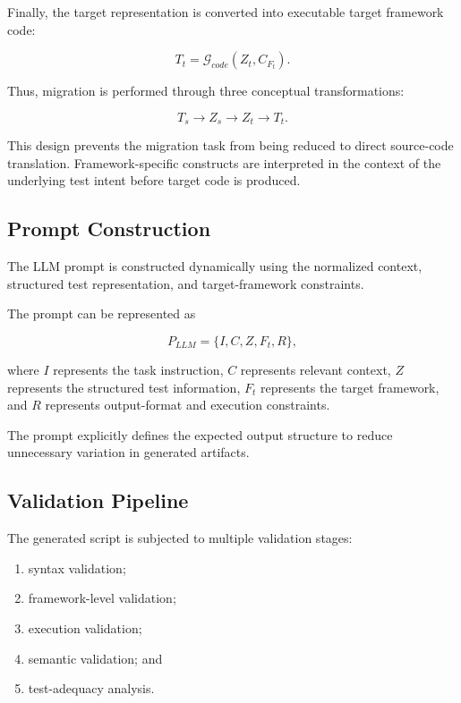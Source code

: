 \documentclass[pdflatex,sn-mathphys-num]{sn-jnl}
\begin{document}
Finally, the target representation is converted into executable target
framework code:

\begin{equation}
    T_t
    =
    \mathcal{G}_{code}
    (
        Z_t,
        C_{F_t}
    ).
\label{eq:migrated-script}
\end{equation}

Thus, migration is performed through three conceptual transformations:

\begin{equation}
    T_s
    \rightarrow
    Z_s
    \rightarrow
    Z_t
    \rightarrow
    T_t.
\label{eq:complete-migration}
\end{equation}

This design prevents the migration task from being reduced to direct
source-code translation. Framework-specific constructs are interpreted in
the context of the underlying test intent before target code is produced.

\subsection{Prompt Construction}
\label{subsec:prompt-construction}

The LLM prompt is constructed dynamically using the normalized context,
structured test representation, and target-framework constraints.

The prompt can be represented as

\begin{equation}
    P_{LLM}
    =
    \{
    I,
    C,
    Z,
    F_t,
    R
    \},
\label{eq:prompt}
\end{equation}

where $I$ represents the task instruction, $C$ represents relevant context,
$Z$ represents the structured test information, $F_t$ represents the target
framework, and $R$ represents output-format and execution constraints.

The prompt explicitly defines the expected output structure to reduce
unnecessary variation in generated artifacts.

\subsection{Validation Pipeline}
\label{subsec:validation-pipeline}

The generated script is subjected to multiple validation stages:

\begin{enumerate}
    \item syntax validation;
    \item framework-level validation;
    \item execution validation;
    \item semantic validation; and
    \item test-adequacy analysis.
\end{enumerate}
\end{document}
